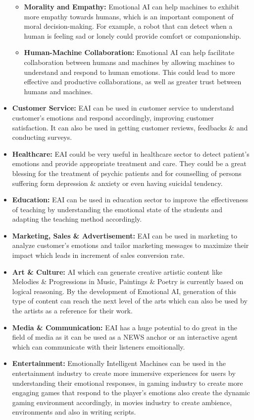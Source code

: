 \begin{itemize}
\begin{itemize}
		\item \textbf{Morality and Empathy:} Emotional AI can help machines to exhibit more empathy towards humans, which is an important component of moral decision-making. For example, a robot that can detect when a human is feeling sad or lonely could provide comfort or companionship.
		\item \textbf{Human-Machine Collaboration:} Emotional AI can help facilitate collaboration between humans and machines by allowing machines to understand and respond to human emotions. This could lead to more effective and productive collaborations, as well as greater trust between humans and machines.
	\end{itemize}
	\item \textbf{Customer Service:} EAI can be used in customer service to understand customer's emotions and respond accordingly, improving customer satisfaction. It can also be used in getting customer reviews, feedbacks \& and conducting surveys.
	\item \textbf{Healthcare:} EAI could be very useful in healthcare sector to detect patient's emotions and provide appropriate treatment and care. They could be a great blessing for the treatment of psychic patients and for counselling of persons suffering form depression \& anxiety or even having suicidal tendency.
	\item \textbf{Education:} EAI can be used in education sector to improve the effectiveness of teaching by understanding the emotional state of the students and adapting the teaching method accordingly.
	\item \textbf{Marketing, Sales \& Advertisement:} EAI can be used in marketing to analyze customer's emotions and tailor marketing messages to maximize their impact which leads in increment of sales conversion rate.
	\item \textbf{Art \& Culture:} AI which can generate creative artistic content like Melodies \& Progressions in Music, Paintings \& Poetry is currently based on logical reasoning. By the development of Emotional AI, generation of this type of content can reach the next level of the arts which can also be used by the artists as a reference for their work.
	\item \textbf{Media \& Communication:} EAI has a huge potential to do great in the field of media as it can be used as a NEWS anchor or an interactive agent which can communicate with their listeners emoitionally.
	\item \textbf{Entertainment:} Emotionally Intelligent Machines can be used in the entertainment industry to create more immersive experiences for users by understanding their emotional responses, in gaming industry to create more engaging games that respond to the player's emotions also create the dynamic gaming environment accordingly, in movies industry to create ambience, environments and also in writing scripts.
\end{itemize}